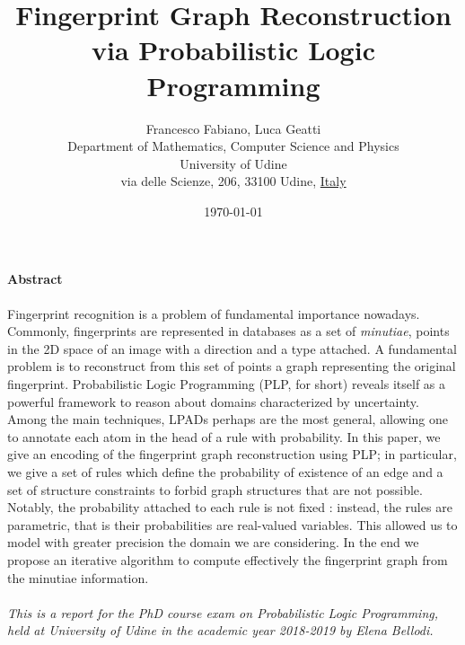 \documentclass[8pt]{article}
\title{Fingerprint Graph Reconstruction via Probabilistic
       Logic Programming}
\author{
        Francesco Fabiano, Luca Geatti\\
        \footnotesize Department of Mathematics, Computer Science and Physics \\
        \footnotesize University of Udine\\
        \footnotesize via delle Scienze, 206, 33100 Udine, \underline{Italy}
}
\date{\footnotesize\today}
\begin{document}
\maketitle
\paragraph{Abstract}
Fingerprint recognition is a problem of fundamental importance nowadays.
Commonly, fingerprints are represented in databases as a set of
\emph{minutiae}, \ie points in the 2D space of an image with a direction and
a type attached. A fundamental problem is to reconstruct from this set of
points a graph representing the original fingerprint.  Probabilistic Logic
Programming (PLP, for short) reveals itself as a powerful framework to reason
about domains characterized by uncertainty. Among the main techniques, LPADs
perhaps are the most general, allowing one to annotate each atom in the head of
a rule with probability.  In this paper, we give an encoding of the fingerprint
graph reconstruction using PLP; in particular, we give a set of rules which
define the probability of existence of an edge and a set of structure
constraints to forbid graph structures that are not possible.  Notably, the
probability attached to each rule is not fixed \apriori: instead, the rules are
parametric, that is their probabilities are real-valued variables. This allowed
us to model with greater precision the domain we are considering.  In the end
we propose an iterative algorithm to compute effectively the fingerprint graph
from the minutiae information.\\~\\
\emph{This is a report for the PhD course exam on Probabilistic Logic
Programming, held at University of Udine in the academic year 2018-2019 by
Elena Bellodi.}
\end{document}
